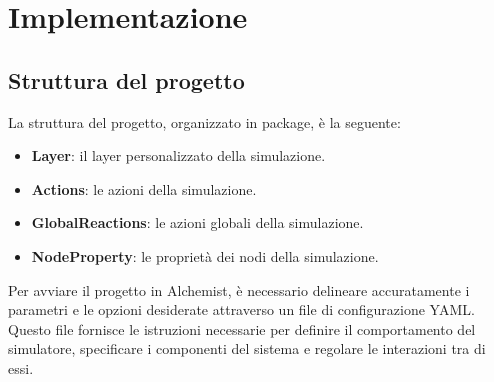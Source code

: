 \chapter{Implementazione}
\section{Struttura del progetto}
La struttura del progetto, organizzato in package, è la seguente:
\begin{itemize}
    \item \textbf{Layer}: il layer personalizzato della simulazione.
    \item \textbf{Actions}: le azioni della simulazione.
    \item \textbf{GlobalReactions}: le azioni globali della simulazione.
    \item \textbf{NodeProperty}: le proprietà dei nodi della simulazione.
\end{itemize}
Per avviare il progetto in Alchemist, è necessario delineare accuratamente i parametri
e le opzioni desiderate attraverso un file di configurazione YAML\@. Questo file fornisce
le istruzioni necessarie per definire il comportamento del simulatore, specificare
i componenti del sistema e regolare le interazioni tra di essi.

